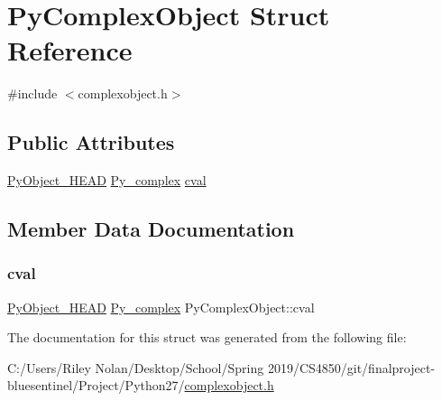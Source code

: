 \hypertarget{struct_py_complex_object}{}\section{Py\+Complex\+Object Struct Reference}
\label{struct_py_complex_object}


{\ttfamily \#include $<$complexobject.\+h$>$}

\subsection*{Public Attributes}
\begin{DoxyCompactItemize}
\item 
\mbox{\hyperlink{_python27_2object_8h_a0bf35c1f3ea13f925de94d8593db3b7e}{Py\+Object\+\_\+\+H\+E\+AD}} \mbox{\hyperlink{struct_py__complex}{Py\+\_\+complex}} \mbox{\hyperlink{struct_py_complex_object_ae369afecae8b5bda8a358a8de2826648}{cval}}
\end{DoxyCompactItemize}


\subsection{Member Data Documentation}
\mbox{\label{struct_py_complex_object_ae369afecae8b5bda8a358a8de2826648}} 
\subsubsection{\texorpdfstring{cval}{cval}}
{\footnotesize\ttfamily \mbox{\hyperlink{_python27_2object_8h_a0bf35c1f3ea13f925de94d8593db3b7e}{Py\+Object\+\_\+\+H\+E\+AD}} \mbox{\hyperlink{struct_py__complex}{Py\+\_\+complex}} Py\+Complex\+Object\+::cval}



The documentation for this struct was generated from the following file\+:\begin{DoxyCompactItemize}
\item 
C\+:/\+Users/\+Riley Nolan/\+Desktop/\+School/\+Spring 2019/\+C\+S4850/git/finalproject-\/bluesentinel/\+Project/\+Python27/\mbox{\hyperlink{complexobject_8h}{complexobject.\+h}}\end{DoxyCompactItemize}
